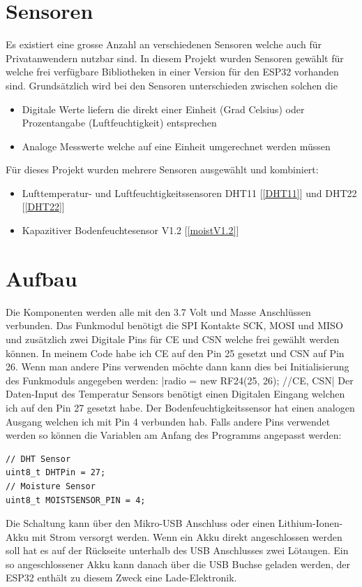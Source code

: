 \documentclass[
  12pt, %
  a4paper, %
  twoside, %
  openany, %
  numbers=noenddot, %
  BCOR=5mm, %
  parskip=half*, %
  thesis, %
]{bfhbook}
\begin{document}
\section{Sensoren}
 Es existiert eine grosse Anzahl an verschiedenen Sensoren welche auch für Privatanwendern nutzbar sind. In diesem Projekt wurden Sensoren gewählt für welche frei verfügbare Bibliotheken in einer Version für den ESP32 vorhanden sind. Grundsätzlich wird bei den Sensoren unterschieden zwischen solchen die 
 \begin{itemize}
	 \item Digitale Werte liefern die direkt einer Einheit (Grad Celsius) oder Prozentangabe (Luftfeuchtigkeit) entsprechen
	  \item Analoge Messwerte welche auf eine Einheit umgerechnet werden müssen
\end{itemize}
Für dieses Projekt wurden mehrere Sensoren ausgewählt und kombiniert:
\begin{itemize}
	\item Lufttemperatur- und Luftfeuchtigkeitssensoren DHT11 [\ref{DHT11}] und DHT22 [\ref{DHT22}]
	\item Kapazitiver Bodenfeuchtesensor V1.2 [\ref{moistV1.2}]
\end{itemize}
\section{Aufbau}
Die Komponenten werden alle mit den 3.7 Volt und Masse Anschlüssen verbunden. Das Funkmodul benötigt die SPI Kontakte SCK, MOSI und MISO und zusätzlich zwei Digitale Pins für CE und CSN welche frei gewählt werden können. In meinem Code habe ich CE auf den Pin 25 gesetzt und CSN auf Pin 26. Wenn man andere Pins verwenden möchte dann kann dies bei Initialisierung des Funkmoduls angegeben werden: |radio = new RF24(25, 26); //CE, CSN|
Der Daten-Input des Temperatur Sensors benötigt einen Digitalen Eingang welchen ich auf den Pin 27 gesetzt habe. Der Bodenfeuchtigkeitssensor hat einen analogen Ausgang welchen ich mit Pin 4 verbunden hab. Falls andere Pins verwendet werden so können die Variablen am Anfang des Programms angepasst werden:
\begin{verbatim}
// DHT Sensor
uint8_t DHTPin = 27;
// Moisture Sensor
uint8_t MOISTSENSOR_PIN = 4;
\end{verbatim}
Die Schaltung kann über den Mikro-USB Anschluss oder einen Lithium-Ionen-Akku mit Strom versorgt werden. Wenn ein Akku direkt angeschlossen werden soll hat es auf der Rückseite  unterhalb des USB Anschlusses zwei Lötaugen. Ein so angeschlossener Akku kann danach über die USB Buchse geladen werden, der ESP32 enthält zu diesem Zweck eine Lade-Elektronik.
\end{document}
